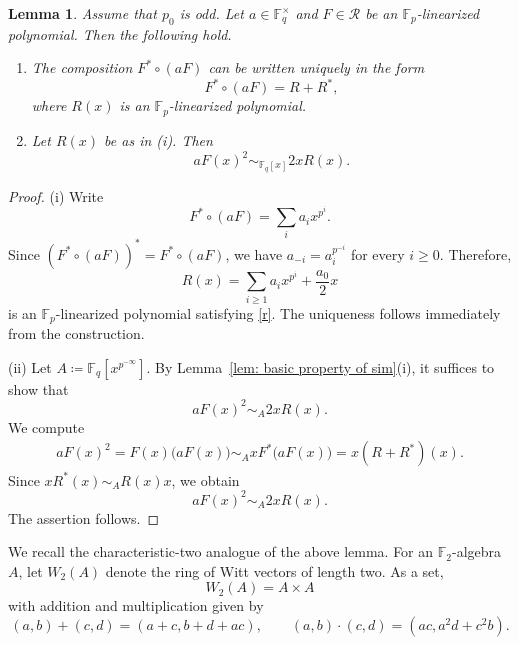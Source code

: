 \documentclass[12pt,a4paper]{amsart}
\newtheorem{lemma}[theorem]{Lemma}
\theoremstyle{definition}
\def\F{{\mathbb F}}
\newcommand{\mc}{\mathcal}
\theoremstyle{remark}
\begin{document}
\begin{lemma}\label{lem: Fast aF=R+Rast}
Assume that $p_0$ is odd. 
Let $a\in \F_q^\times$ and $F\in\mc R$ be an $\F_p$-linearized polynomial. Then the following hold. 
\begin{enumerate}
    \item The composition $F^\ast \circ (aF)$ can be written uniquely in the form
\begin{equation}\label{r}
F^\ast \circ (aF)=R+R^\ast,
\end{equation}
where $R(x)$ is an $\F_p$-linearized polynomial. 
\item Let $R(x)$ be as in {\rm (i)}. Then 
\[
a F(x)^2 \sim_{\F_q[x]} 2 x R(x). 
\]
\end{enumerate}
\end{lemma}
\begin{proof}
(i) Write 
\[
F^\ast\circ(aF)=\sum_ia_ix^{p^i}. 
\]
Since $(F^\ast\circ(aF))^\ast=F^\ast\circ(aF)$, we have $a_{-i}=a_i^{p^{-i}}$ for every $i\geq0$. 
Therefore, 
\[
R(x)=\sum_{i\geq1}a_i x^{p^i}+\frac{a_0}{2}x
\]
is an $\F_p$-linearized polynomial satisfying \eqref{r}. The uniqueness follows immediately from the construction. 

\noindent
(ii) Let $A\coloneqq \F_q[x^{p^{-\infty}}]$. By Lemma~\ref{lem: basic property of sim}(i), it suffices to show that 
\[aF(x)^2\sim_{A}2xR(x). \]
We compute 
\begin{align*}
aF(x)^2=F(x)\bigl(aF(x)\bigr)\sim_AxF^\ast\bigl(aF(x)\bigr)=x(R+R^\ast)(x). 
\end{align*}
Since $xR^\ast(x)\sim_A R(x)x$, we obtain 
\[
aF(x)^2\sim_A2xR(x). 
\]
The assertion follows. 
\end{proof}

We recall the characteristic-two analogue of the above lemma.  For an $\F_2$-algebra $A$, let $W_2(A)$ denote the ring of Witt vectors of length two. As a set, 
\[
W_2(A)=A\times A
\]
with addition and multiplication given by 
\[
(a,b)+(c,d)=(a+c,b+d+ac),\qquad (a,b)\cdot(c,d)=(ac,a^2d+c^2b). 
\]
\end{document}
